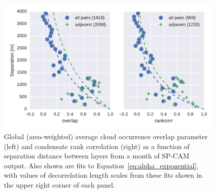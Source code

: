 \begin{figure}[htbp]
\centering
\includegraphics{graphics/subgrid2_overlap_dz.pdf}
\caption{\label{fig:overlap_dz}Global (area-weighted) average cloud
occurrence overlap parameter (left) and condensate rank correlation
(right) as a function of separation distance between layers from a month
of SP-CAM output. Also shown are fits to
Equation~\ref{eq:alpha_exponential}, with values of decorrelation length
scales from these fits shown in the upper right corner of each
panel.}\label{fig:overlapux5fdz}
\end{figure}

